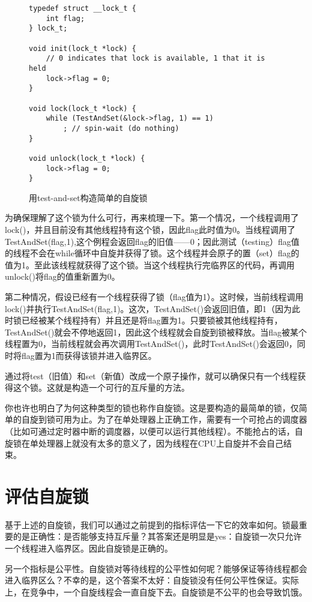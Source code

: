 \begin{figure}[h]
\begin{lstlisting}
typedef struct __lock_t {
    int flag;
} lock_t;

void init(lock_t *lock) {
    // 0 indicates that lock is available, 1 that it is held
    lock->flag = 0;
}

void lock(lock_t *lock) {
    while (TestAndSet(&lock->flag, 1) == 1)
        ; // spin-wait (do nothing)
}

void unlock(lock_t *lock) {
    lock->flag = 0;
}
\end{lstlisting}
\caption{用test-and-set构造简单的自旋锁}
\end{figure}

为确保理解了这个锁为什么可行，再来梳理一下。第一个情况，一个线程调用了lock()，并且目前没有其他线程持有这个锁，因此flag此时值为0。当线程调用了TestAndSet(flag,1),这个例程会返回flag的旧值——0；因此测试（testing）flag值的线程不会在while循环中自旋并获得了锁。这个线程并会原子的置（set）flag的值为1。至此该线程就获得了这个锁。当这个线程执行完临界区的代码，再调用unlock()将flag的值重新置为0。

第二种情况，假设已经有一个线程获得了锁（flag值为1）。这时候，当前线程调用lock()并执行TestAndSet(flag,1)。这次，TestAndSet()会返回旧值，即1（因为此时锁已经被某个线程持有）并且还是将flag置为1。只要锁被其他线程持有，TestAndSet()就会不停地返回1，因此这个线程就会自旋到锁被释放。当flag被某个线程置为0，当前线程就会再次调用TestAndSet()，此时TestAndSet()会返回0，同时将flag置为1而获得该锁并进入临界区。

通过将test（旧值）和set（新值）改成一个原子操作，就可以确保只有一个线程获得这个锁。这就是构造一个可行的互斥量的方法。

你也许也明白了为何这种类型的锁也称作自旋锁。这是要构造的最简单的锁，仅简单的自旋到锁可用为止。为了在单处理器上正确工作，需要有一个可抢占的调度器（比如可通过定时器中断的调度器，以便可以运行其他线程）。不能抢占的话，自旋锁在单处理器上就没有太多的意义了，因为线程在CPU上自旋并不会自己结束。

\section{评估自旋锁}
基于上述的自旋锁，我们可以通过之前提到的指标评估一下它的效率如何。锁最重要的是正确性：是否能够支持互斥量？其答案还是明显是yes：自旋锁一次只允许一个线程进入临界区。因此自旋锁是正确的。

另一个指标是公平性。自旋锁对等待线程的公平性如何呢？能够保证等待线程都会进入临界区么？不幸的是，这个答案不太好：自旋锁没有任何公平性保证。实际上，在竞争中，一个自旋线程会一直自旋下去。自旋锁是不公平的也会导致饥饿。

